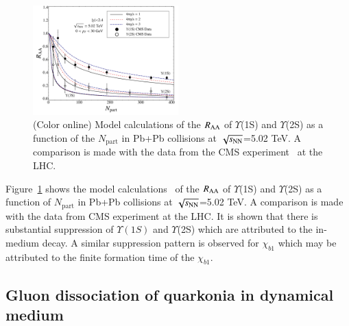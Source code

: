 \begin{figure}[t]
\begin{center}
\includegraphics[width=0.5\textwidth]{Figures/Fig18_YnsRAA_NPart_StricklandModel.pdf}
\end{center}
\vspace{-7mm}
\caption{(Color online) Model calculations \cite{Krouppa:2018lkt} of the $R_{\rm AA}$
  of $\Upsilon$(1S) and $\Upsilon$(2S) as a function of the $N_{\text{part}}$
  in Pb+Pb collisions at $\sqrt{s_{\rm NN}}$=5.02 TeV.   
  A comparison is made with the data from the CMS experiment~\cite{CMS:2018zza} at
  the LHC.}
\label{fig:raasep}
\end{figure}

Figure~\ref{fig:raasep} shows the model calculations~\cite{Krouppa:2018lkt}
of the $R_{\rm AA}$ of $\Upsilon$(1S) and $\Upsilon$(2S) as a function of
$N_{\text{part}}$  in Pb+Pb collisions at $\sqrt{s_{\rm NN}}$=5.02 TeV.   
  A comparison is made with the data from CMS experiment \cite{CMS:2018zza} at
  the LHC. It is shown that there is substantial 
suppression  of $\Upsilon(1S)$ and $\Upsilon$(2S) which are attributed to the in-medium decay.  
A  similar suppression pattern is observed for $\chi_{b1}$ which 
may be attributed to the finite formation time of the $\chi_{b1}$. 
  


\subsection{Gluon dissociation of quarkonia in dynamical medium}

